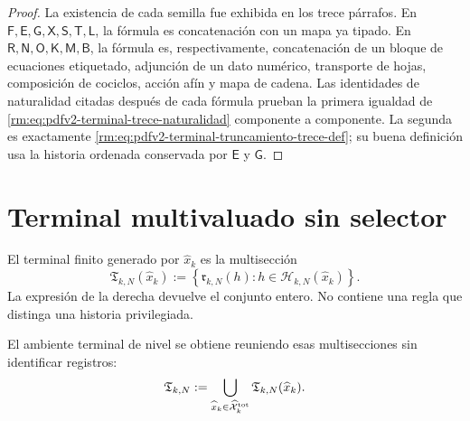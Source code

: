 \begin{proof}
La existencia de cada semilla fue exhibida en los trece párrafos. En
\(\mathsf F,\mathsf E,\mathsf G,\mathsf X,\mathsf S,\mathsf T,\mathsf L\),
la fórmula es concatenación con un mapa ya tipado. En
\(\mathsf R,\mathsf N,\mathsf O,\mathsf K,\mathsf M,\mathsf B\), la
fórmula es, respectivamente, concatenación de un bloque de ecuaciones
etiquetado, adjunción de un dato numérico, transporte de hojas, composición
de cociclos, acción afín y mapa de cadena. Las identidades de naturalidad
citadas después de cada fórmula prueban la primera igualdad de
\eqref{rm:eq:pdfv2-terminal-trece-naturalidad} componente a componente. La
segunda es exactamente
\eqref{rm:eq:pdfv2-terminal-truncamiento-trece-def}; su buena definición usa la
historia ordenada conservada por \(\mathsf E\) y \(\mathsf G\).
\end{proof}

\section{Terminal multivaluado sin selector}

El terminal finito generado por \(\widehat x_k\) es la multisecci\'on
\begin{equation}
\label{rm:eq:pdfv2-terminal-multivaluado}
 \mathfrak T_{k,N}(\widehat x_k)
 :=\left\{\mathfrak r_{k,N}(h):
            h\in\mathscr H_{k,N}(\widehat x_k)\right\}.
\end{equation}
La expresi\'on de la derecha devuelve el conjunto entero. No contiene una
regla que distinga una historia privilegiada.

El ambiente terminal de nivel se obtiene reuniendo esas multisecciones sin
identificar registros:
\begin{equation}
\label{rm:eq:pdfv2-terminal-ambiente-nivel}
 \mathfrak T_{k,N}
 :=\bigcup_{\widehat x_k\in\widehat{\mathcal X}^{\rm tot}_k}
   \mathfrak T_{k,N}(\widehat x_k).
\end{equation}


